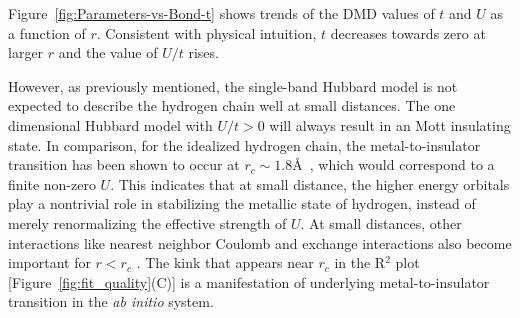 Figure~\ref{fig:Parameters-vs-Bond-t} shows trends of the DMD values of $t$ and $U$ as a function of $r$. 
Consistent with physical intuition, $t$ decreases towards zero at larger $r$
and the value of $U/t$ rises. 


However, as previously mentioned, the single-band 
Hubbard model is not expected to describe the hydrogen chain well at small distances. 
The one dimensional Hubbard model with $U/t>0$ will always result in 
an Mott insulating state. In comparison, for the idealized hydrogen chain, the 
metal-to-insulator transition has been shown to occur at $r_c \sim 1.8$\AA~\cite{Stella2011}, which would correspond 
to a finite non-zero $U$. This indicates that at small distance, the higher energy orbitals play a nontrivial 
role in stabilizing the metallic state of hydrogen, instead of merely renormalizing the effective strength of $U$. 
At small distances, other interactions like nearest neighbor Coulomb 
and exchange interactions also become important for $r<r_c$ \cite{ZhengThesis}. The kink that appears near $r_c$ in the R$^2$ plot [Figure~\ref{fig:fit_quality}(C)] is a manifestation of underlying metal-to-insulator transition in the \textit{ab initio} system. 
